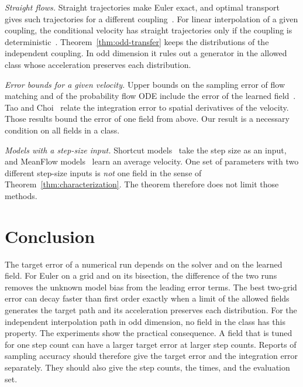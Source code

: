 \emph{Straight flows.} Straight trajectories make Euler exact, and
optimal transport gives such trajectories for a different
coupling~\citep{mccann1997convexity,benamou2000computational,pooladian2023multisample,tong2024improving}.
For linear interpolation of a given coupling, the conditional velocity
has straight trajectories only if the coupling is
deterministic~\citep[Theorem~2.6]{tsimpos2026oneshot}.
Theorem~\ref{thm:odd-transfer} keeps the distributions of the
independent coupling. In odd dimension it rules out a generator in the
allowed class whose acceleration preserves each distribution.

\emph{Error bounds for a given velocity.} Upper bounds on the
sampling error of flow matching and of the probability flow ODE include
the error of the learned
field~\citep{benton2024error,zhou2025error,stephanovitch2026lipschitz,chen2023probability,albergo2025stochastic}.
Tao and Choi~\citep{tao2026strain} relate the integration error to
spatial derivatives of the velocity. Those results bound the error of one
field from above. Our result is a necessary condition on all fields in
a class.

\emph{Models with a step-size input.} Shortcut
models~\citep{frans2025shortcut} take the step size as an input, and
MeanFlow models~\citep{geng2025meanflow} learn an average velocity. One
set of parameters with two different step-size inputs is \emph{not} one
field in the sense of Theorem~\ref{thm:characterization}. The theorem
therefore does not limit those methods.

\section{Conclusion}
\label{sec:conclusion}
The target error of a numerical run depends on the solver and on the
learned field. For Euler on a grid and on its bisection, the difference
of the two runs removes the unknown model bias from the leading error
terms. The best two-grid error can decay faster than first order exactly when
a limit of the allowed fields generates the target path and its
acceleration preserves each distribution. For the independent interpolation path in odd dimension,
no field in the class has this property. The experiments show the practical
consequence. A field that is tuned for one step count can have a larger
target error at larger step counts. Reports of sampling accuracy
should therefore give the target error and the integration error
separately. They should also give the step counts, the times, and the
evaluation set.\AIassistance

